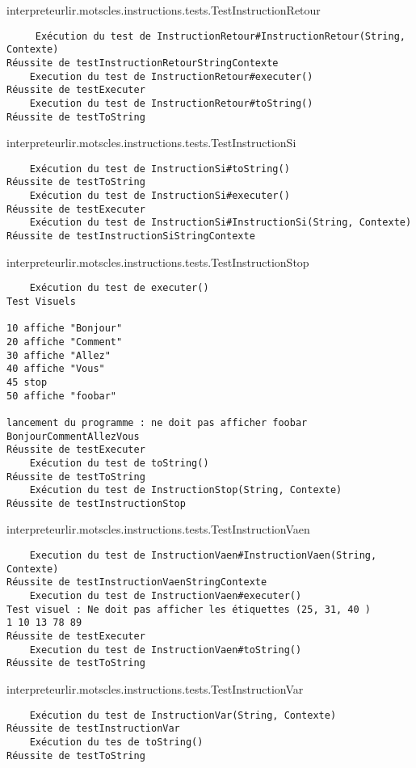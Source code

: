 \begin{enum}
    \item interpreteurlir.motscles.instructions.tests.TestInstructionRetour
\begin{verbatim}
     Exécution du test de InstructionRetour#InstructionRetour(String, Contexte)
Réussite de testInstructionRetourStringContexte
    Execution du test de InstructionRetour#executer()
Réussite de testExecuter
    Execution du test de InstructionRetour#toString()
Réussite de testToString
\end{verbatim}

    \item interpreteurlir.motscles.instructions.tests.TestInstructionSi
\begin{verbatim}
    Exécution du test de InstructionSi#toString()
Réussite de testToString
    Exécution du test de InstructionSi#executer()
Réussite de testExecuter
    Exécution du test de InstructionSi#InstructionSi(String, Contexte)
Réussite de testInstructionSiStringContexte
\end{verbatim}

    \item interpreteurlir.motscles.instructions.tests.TestInstructionStop
\begin{verbatim}
    Exécution du test de executer()
Test Visuels

10 affiche "Bonjour"
20 affiche "Comment"
30 affiche "Allez"
40 affiche "Vous"
45 stop
50 affiche "foobar"

lancement du programme : ne doit pas afficher foobar
BonjourCommentAllezVous
Réussite de testExecuter
    Exécution du test de toString()
Réussite de testToString
    Exécution du test de InstructionStop(String, Contexte)
Réussite de testInstructionStop
\end{verbatim}

    \item interpreteurlir.motscles.instructions.tests.TestInstructionVaen
\begin{verbatim}
    Execution du test de InstructionVaen#InstructionVaen(String, Contexte)
Réussite de testInstructionVaenStringContexte
    Execution du test de InstructionVaen#executer()
Test visuel : Ne doit pas afficher les étiquettes (25, 31, 40 )
1 10 13 78 89 
Réussite de testExecuter
    Execution du test de InstructionVaen#toString()
Réussite de testToString
\end{verbatim}

    \item interpreteurlir.motscles.instructions.tests.TestInstructionVar
\begin{verbatim}
    Exécution du test de InstructionVar(String, Contexte)
Réussite de testInstructionVar
    Exécution du tes de toString()
Réussite de testToString
\end{verbatim}


\end{enum}
